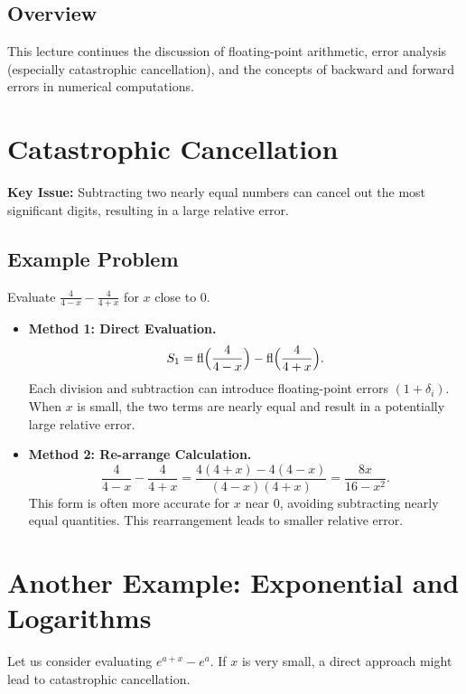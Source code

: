 \subsection*{Overview}

This lecture continues the discussion of floating-point arithmetic, error analysis (especially catastrophic cancellation), and the concepts of backward and forward errors in numerical computations.

\section*{Catastrophic Cancellation}

\noindent
\textbf{Key Issue:} Subtracting two nearly equal numbers can cancel out the most significant digits, resulting in a large relative error.

\subsection*{Example Problem}

Evaluate $\displaystyle \frac{4}{4 - x} - \frac{4}{4 + x}$ for $x$ close to $0$.

\begin{itemize}
  \item \textbf{Method 1: Direct Evaluation.}
  \[
    S_1 = \mathrm{fl}\Bigl(\frac{4}{4 - x}\Bigr) - \mathrm{fl}\Bigl(\frac{4}{4 + x}\Bigr).
  \]
  Each division and subtraction can introduce floating-point errors $(1 + \delta_i)$. When $x$ is small, the two terms are nearly equal and result in a potentially large relative error.

  \item \textbf{Method 2: Re-arrange Calculation.}
  \[
    \frac{4}{4 - x} - \frac{4}{4 + x}
    = \frac{4(4 + x) - 4(4 - x)}{(4 - x)(4 + x)}
    = \frac{8x}{16 - x^2}.
  \]
  This form is often more accurate for $x$ near $0$, avoiding subtracting nearly equal quantities. This rearrangement leads to smaller relative error.
\end{itemize}

\section*{Another Example: Exponential and Logarithms}

Let us consider evaluating $\displaystyle e^{a+x} - e^a$. If $x$ is very small, a direct approach might lead to catastrophic cancellation.

